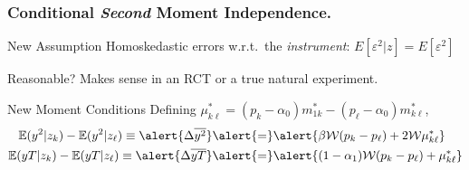 \documentclass{beamer}
\begin{document}
\begin{frame}
  \frametitle{Conditional \emph{Second} Moment Independence.} 
  \begin{block}{New Assumption}
    Homoskedastic errors w.r.t.\ the \emph{instrument}: $E[\varepsilon^2|z]=E[\varepsilon^2]$
  \end{block}
  \begin{block}{Reasonable?}
    Makes sense in an RCT or a true natural experiment.
  \end{block}
  \begin{alertblock}{New Moment Conditions}
  Defining
    $\mu_{k\ell}^* =  (p_k - \alpha_0) m_{1k}^* - (p_{\ell}-\alpha_0)m_{k\ell}^*$, 
  \begin{align*}
    \mathbb{E}(y^2|z_k) - \mathbb{E}(y^2|z_\ell) \equiv \alert{\Delta\overline{y^2}} &\alert{=}  \alert{\beta \mathcal{W} (p_k - p_\ell)  + 2 \mathcal{W} \mu_{k\ell}^*}\\
    \mathbb{E}(yT|z_k) - \mathbb{E}(yT|z_\ell) \equiv \alert{ \Delta\overline{yT}} &\alert{=} \alert{(1-\alpha_1)\mathcal{W}(p_k - p_\ell) + \mu_{k\ell}^*}
  \end{align*}
  \end{alertblock}
\end{frame}
%
%
%
%
\end{document}

